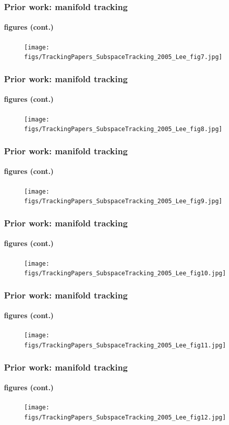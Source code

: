 \begin{frame}
\frametitle{Prior work: manifold tracking}
\framesubtitle{figures (cont.)}
\logoCSIPCPL\mypagenum
	\begin{figure}
		\texttt{[image: figs/TrackingPapers\_SubspaceTracking\_2005\_Lee\_fig7.jpg]}
	\end{figure}
\end{frame}


\begin{frame}
\frametitle{Prior work: manifold tracking}
\framesubtitle{figures (cont.)}
\logoCSIPCPL\mypagenum
	\begin{figure}
		\texttt{[image: figs/TrackingPapers\_SubspaceTracking\_2005\_Lee\_fig8.jpg]}
	\end{figure}
\end{frame}


\begin{frame}
\frametitle{Prior work: manifold tracking}
\framesubtitle{figures (cont.)}
\logoCSIPCPL\mypagenum
	\begin{figure}
		\texttt{[image: figs/TrackingPapers\_SubspaceTracking\_2005\_Lee\_fig9.jpg]}
	\end{figure}
\end{frame}


\begin{frame}
\frametitle{Prior work: manifold tracking}
\framesubtitle{figures (cont.)}
\logoCSIPCPL\mypagenum
	\begin{figure}
		\texttt{[image: figs/TrackingPapers\_SubspaceTracking\_2005\_Lee\_fig10.jpg]}
	\end{figure}
\end{frame}



\begin{frame}
\frametitle{Prior work: manifold tracking}
\framesubtitle{figures (cont.)}
\logoCSIPCPL\mypagenum
	\begin{figure}
		\texttt{[image: figs/TrackingPapers\_SubspaceTracking\_2005\_Lee\_fig11.jpg]}
	\end{figure}
\end{frame}


\begin{frame}
\frametitle{Prior work: manifold tracking}
\framesubtitle{figures (cont.)}
\logoCSIPCPL\mypagenum
	\begin{figure}
		\texttt{[image: figs/TrackingPapers\_SubspaceTracking\_2005\_Lee\_fig12.jpg]}
	\end{figure}
\end{frame}


